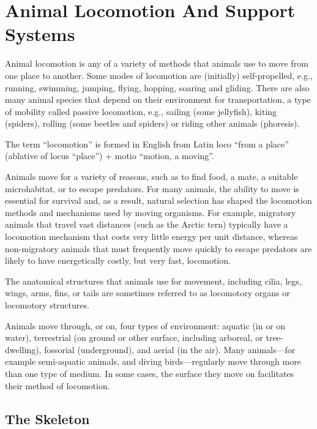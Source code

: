\hypertarget{animal-locomotion-and-support-systems}{%
\chapter{Animal Locomotion And Support Systems}\label{animal-locomotion-and-support-systems}}

Animal locomotion is any of a variety of methods that animals use to move from one place to another. Some modes of locomotion are (initially) self-propelled, e.g., running, swimming, jumping, flying, hopping, soaring and gliding. There are also many animal species that depend on their environment for transportation, a type of mobility called passive locomotion, e.g., sailing (some jellyfish), kiting (spiders), rolling (some beetles and spiders) or riding other animals (phoresis).

The term ``locomotion'' is formed in English from Latin loco ``from a place'' (ablative of locus ``place'') + motio ``motion, a moving''.

Animals move for a variety of reasons, such as to find food, a mate, a suitable microhabitat, or to escape predators. For many animals, the ability to move is essential for survival and, as a result, natural selection has shaped the locomotion methods and mechanisms used by moving organisms. For example, migratory animals that travel vast distances (such as the Arctic tern) typically have a locomotion mechanism that costs very little energy per unit distance, whereas non-migratory animals that must frequently move quickly to escape predators are likely to have energetically costly, but very fast, locomotion.

The anatomical structures that animals use for movement, including cilia, legs, wings, arms, fins, or tails are sometimes referred to as locomotory organs or locomotory structures.

Animals move through, or on, four types of environment: aquatic (in or on water), terrestrial (on ground or other surface, including arboreal, or tree-dwelling), fossorial (underground), and aerial (in the air). Many animals---for example semi-aquatic animals, and diving birds---regularly move through more than one type of medium. In some cases, the surface they move on facilitates their method of locomotion.

\hypertarget{the-skeleton}{%
\section{The Skeleton}\label{the-skeleton}}

